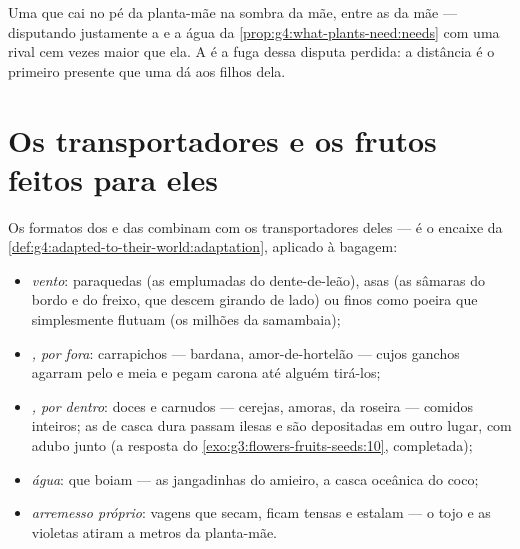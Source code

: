 \begin{example}\label{ex:g6:how-plants-spread:whyleave}
Uma  que cai no pé da planta-mãe  na sombra da mãe,
entre as  da mãe --- disputando justamente a  e a água da
\cref{prop:g4:what-plants-need:needs} com uma rival cem vezes maior
que ela. A  é a fuga dessa disputa perdida: a distância é o
primeiro presente que uma  dá aos filhos dela.
\end{example}

\section{Os transportadores e os frutos feitos para eles}

\begin{proposition}\label{prop:g6:how-plants-spread:builds}
Os formatos dos  e das  combinam com os
transportadores deles --- é o encaixe da
\cref{def:g4:adapted-to-their-world:adaptation}, aplicado à bagagem:
\begin{itemize}
  \item \emph{vento}: paraquedas (as  emplumadas do
        dente-de-leão), asas (as sâmaras do bordo e do freixo, que
        descem girando de lado) ou  finos como poeira que
        simplesmente flutuam (os milhões da samambaia);
  \item \emph{, por fora}: carrapichos --- bardana, amor-de-hortelão
        --- cujos ganchos agarram pelo e meia e pegam carona até
        alguém tirá-los;
  \item \emph{, por dentro}:  doces e carnudos ---
        cerejas, amoras,  da roseira --- comidos inteiros; as
         de casca dura passam ilesas e são depositadas em
        outro lugar, com adubo junto (a resposta do
        \cref{exo:g3:flowers-fruits-seeds:10}, completada);
  \item \emph{água}:  que boiam --- as jangadinhas do amieiro,
        a casca oceânica do coco;
  \item \emph{arremesso próprio}: vagens que secam, ficam tensas e
        estalam --- o tojo e as violetas atiram  a metros da
        planta-mãe.
\end{itemize}
\end{proposition}
\admitted

